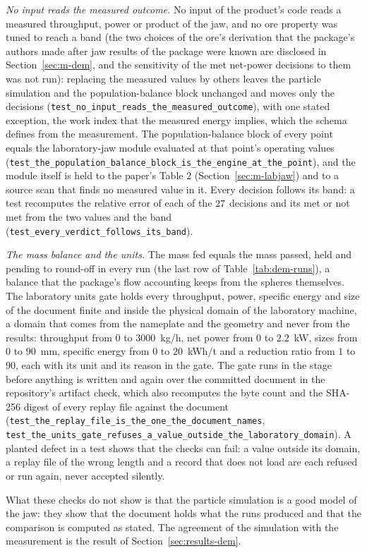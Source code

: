 \emph{No input reads the measured outcome.} No input of the product's code reads a measured throughput, power or product of the jaw, and no ore property was tuned to reach a band (the two choices of the ore's derivation that the package's authors made after jaw results of the package were known are disclosed in Section~\ref{sec:m-dem}, and the sensitivity of the met net-power decisions to them was not run): replacing the measured values by others leaves the particle simulation and the population-balance block unchanged and moves only the decisions (\texttt{test\_no\_input\_reads\_the\_measured\_outcome}), with one stated exception, the work index that the measured energy implies, which the schema defines from the measurement. The population-balance block of every point equals the laboratory-jaw module evaluated at that point's operating values (\texttt{test\_the\_population\_balance\_block\_is\_the\_engine\_at\_the\_point}), and the module itself is held to the paper's Table 2 (Section~\ref{sec:m-labjaw}) and to a source scan that finds no measured value in it. Every decision follows its band: a test recomputes the relative error of each of the $27$ decisions and its met or not met from the two values and the band (\texttt{test\_every\_verdict\_follows\_its\_band}).

\emph{The mass balance and the units.} The mass fed equals the mass passed, held and pending to round-off in every run (the last row of Table~\ref{tab:dem-runs}), a balance that the package's flow accounting keeps from the spheres themselves. The laboratory units gate holds every throughput, power, specific energy and size of the document finite and inside the physical domain of the laboratory machine, a domain that comes from the nameplate and the geometry and never from the results: throughput from $0$ to $3000$~kg/h, net power from $0$ to $2.2$~kW, sizes from $0$ to $90$~mm, specific energy from $0$ to $20$~kWh/t and a reduction ratio from $1$ to $90$, each with its unit and its reason in the gate. The gate runs in the stage before anything is written and again over the committed document in the repository's artifact check, which also recomputes the byte count and the SHA-256 digest of every replay file against the document (\texttt{test\_the\_replay\_file\_is\_the\_one\_the\_document\_names}, \texttt{test\_the\_units\_gate\_refuses\_a\_value\_outside\_the\_laboratory\_domain}). A planted defect in a test shows that the checks can fail: a value outside its domain, a replay file of the wrong length and a record that does not load are each refused or run again, never accepted silently.

What these checks do not show is that the particle simulation is a good model of the jaw: they show that the document holds what the runs produced and that the comparison is computed as stated. The agreement of the simulation with the measurement is the result of Section~\ref{sec:results-dem}.
